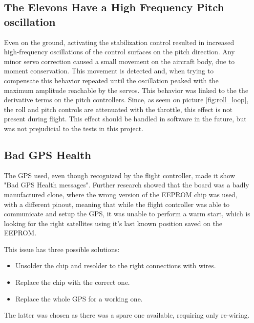 \subsection{The Elevons Have a High Frequency Pitch oscillation}
Even on the ground, activating the stabilization control resulted in increased high-frequency oscillations of the control surfaces on the pitch direction.
%
Any minor servo correction caused a small movement on the aircraft body, due to moment conservation. This movement is detected and, when trying to compensate this behavior repeated until the oscillation peaked with the maximum amplitude reachable by the servos.
%
This behavior was linked to the the derivative terms on the pitch controllers.
%
Since, as seem on picture \ref{fig:roll_loop}, the roll and pitch controls are attenuated with the throttle, this effect is not present during flight. This effect should be handled in software in the future, but was not prejudicial to the tests in this project.

\subsection{Bad GPS Health}
\label{badgps}
The GPS used, even though recognized by the flight controller, made it show "Bad GPS Health messages". Further research showed that the board was a badly manufactured clone\cite{badgps}, where the wrong version of the EEPROM chip was used, with a different pinout, meaning that while the flight controller was able to communicate and setup the GPS, it was unable to perform a warm start, which is looking for the right satellites using it's last known position saved on the EEPROM.

This issue has three possible solutions:
\begin{itemize}
\item Unsolder the chip and resolder to the right connections with wires.
\item Replace the chip with the correct one.
\item Replace the whole GPS for a working one.
\end{itemize}

The latter was chosen as there was a spare one available, requiring only re-wiring.